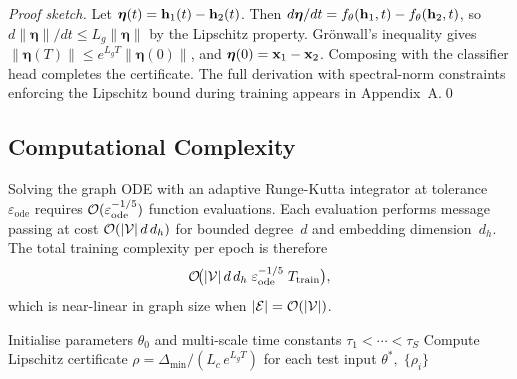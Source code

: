 \noindent\textit{Proof sketch.} Let $\bm{\eta}(t)=\mathbf{h}_1(t)-\mathbf{h}_2(t)$. Then $d\bm{\eta}/dt = f_\theta(\mathbf{h}_1,t)-f_\theta(\mathbf{h}_2,t)$, so $d\|\bm{\eta}\|/dt\le L_g\|\bm{\eta}\|$ by the Lipschitz property. Gr\"{o}nwall's inequality gives $\|\bm{\eta}(T)\|\le e^{L_g T}\|\bm{\eta}(0)\|$, and $\bm{\eta}(0)=\mathbf{x}_1-\mathbf{x}_2$. Composing with the classifier head completes the certificate. The full derivation with spectral-norm constraints enforcing the Lipschitz bound during training appears in Appendix~A.\qed

\subsection{Computational Complexity}

Solving the graph ODE with an adaptive Runge-Kutta integrator at tolerance~$\varepsilon_{\mathrm{ode}}$ requires $\mathcal{O}(\varepsilon_{\mathrm{ode}}^{-1/5})$ function evaluations. Each evaluation performs message passing at cost $\mathcal{O}(|\mathcal{V}|\,d\,d_h)$ for bounded degree~$d$ and embedding dimension~$d_h$. The total training complexity per epoch is therefore
\begin{equation}
\mathcal{O}\!\bigl(|\mathcal{V}|\,d\,d_h\;\varepsilon_{\mathrm{ode}}^{-1/5}\;T_{\mathrm{train}}\bigr),
\label{eq:ct_tgnn_complex}
\end{equation}
which is near-linear in graph size when $|\mathcal{E}|=\mathcal{O}(|\mathcal{V}|)$.

\begin{algorithm}[htbp]
\caption{CT-TGNN Training with Adjoint Sensitivity}\label{alg:ct_tgnn}
Initialise parameters $\theta_0$ and multi-scale time constants $\tau_1<\cdots<\tau_S$\;
Compute Lipschitz certificate $\rho = \Delta_{\min}/(L_c\,e^{L_g T})$ for each test input\;
\Return $\theta^*,\;\{\rho_i\}$
\end{algorithm}


